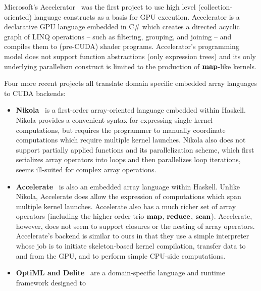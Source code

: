 \documentclass[preprint]{sigplanconf}
\begin{document}
Microsoft's Accelerator~\cite{Tard06} was the first project to use high level (collection-oriented) language constructs as a basis for GPU execution. Accelerator is a declarative GPU language embedded in C\# which creates a directed acyclic graph of LINQ operations -- such as filtering, grouping, and joining -- and compiles them to (pre-CUDA) shader programs. Accelerator's programming model does not support function abstractions (only expression trees) and its only underlying parallelism construct is limited to the production of $\mbox{\textbf{map}}$-like kernels.

Four more recent projects all translate domain specific embedded array languages to CUDA backends:
\begin{itemize}
\item \textbf{Nikola}~\cite{Main10} is a first-order array-oriented language embedded within Haskell. Nikola provides a convenient syntax for expressing single-kernel computations, but requires the programmer to manually coordinate computations which require multiple kernel launches. Nikola also does not support partially applied functions and its parallelization scheme, which first serializes array operators into loops and then parallelizes loop iterations, seems ill-suited for complex array operations.

\item \textbf{Accelerate}~\cite{ChakAcc} is also an embedded array language within Haskell. Unlike Nikola, Accelerate does allow the expression of computations which span multiple kernel launches. Accelerate also has a much richer set of array operators (including the higher-order trio $\mbox{\textbf{map}}$, $\mbox{\textbf{reduce}}$, $\mbox{\textbf{scan}}$). Accelerate, however, does not seem to support closures or the nesting of array operators. Accelerate's backend is similar to ours in that they use a simple interpreter whose job is to initiate skeleton-based kernel compilation, transfer data to and from the GPU, and to perform simple CPU-side computations.

\item \textbf{OptiML and Delite}~\cite{Chaf11} are a domain-specific language and runtime framework designed to 


\end{itemize}
\end{document}
